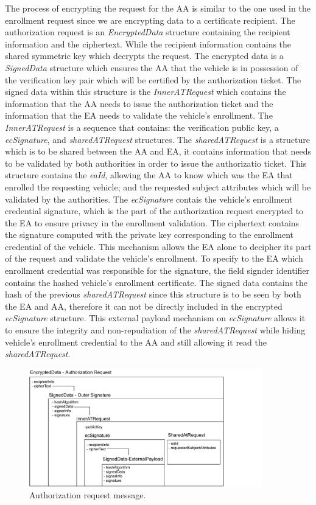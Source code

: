 The process of encrypting the request for the AA is similar to the one used in the enrollment request since we are encrypting data to a certificate recipient. The authorization request is an \textit{EncryptedData} structure containing the recipient information and the ciphertext. While the recipient information contains the shared symmetric key which decrypts the request. The encrypted data is a \textit{SignedData} structure which ensures the AA that the vehicle is in possession of the verification key pair which will be certified by the authorization ticket. The signed data within this structure is the \textit{InnerATRequest} which contains the information that the AA needs to issue the authorization ticket and the information that the EA needs to validate the vehicle's enrollment. The \textit{InnerATRequest} is a sequence that contains: the verification public key, a \textit{ecSignature}, and \textit{sharedATRequest} structures. The \textit{sharedATRequest} is a structure which is to be shared between the AA and EA, it contains information that needs to be validated by both authorities in order to issue the authorizatio ticket. This structure contains the \textit{eaId}, allowing the AA to know which was the EA that enrolled the requesting vehicle; and the requested subject attributes which will be validated by the authorities. The \textit{ecSignature} contais the vehicle's enrollment credential signature, which is the part of the authorization request encrypted to the EA to ensure privacy in the enrollment validation. The ciphertext contains the signature computed with the private key corresponding to the enrollment credential of the vehicle. This mechanism allows the EA alone to decipher its part of the request and validate the vehicle's enrollment. To specify to the EA which enrollment credential was responsible for the signature, the field signder identifier contains the hashed vehicle's enrollment certificate. The signed data contains the hash of the previous \textit{sharedATRequest} since this structure is to be seen by both the EA and AA, therefore it can not be directly included in the encrypted \textit{ecSignature} structure. This external payload mechanism on \textit{ecSignature} allows it to ensure the integrity and non-repudiation of the \textit{sharedATRequest} while hiding vehicle's enrollment credential to the AA and still allowing it read the \textit{sharedATRequest}. 

\begin{figure}
	\centering
	\includegraphics[width=0.9\textwidth]{Figures/authorizationrequest}
	\caption{\label{fig:authorization_request}Authorization request message.}
\end{figure}

